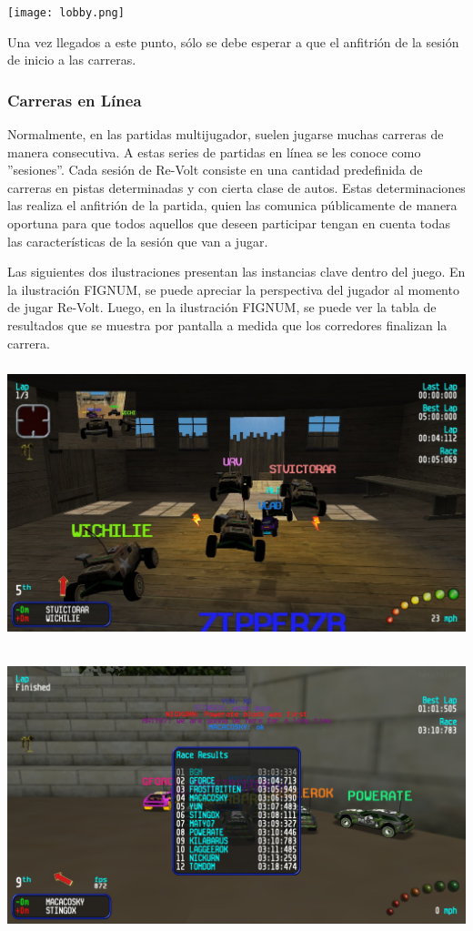 \texttt{[image: lobby.png]}

Una vez llegados a este punto, sólo se debe esperar a que el anfitrión de la sesión de inicio a las carreras.

\subsubsection{Carreras en Línea}
Normalmente, en las partidas multijugador, suelen jugarse muchas carreras de manera consecutiva. A estas series de partidas en línea se les conoce como ''sesiones''. Cada sesión de Re-Volt consiste en una cantidad predefinida de carreras en pistas determinadas y con cierta clase de autos. Estas determinaciones las realiza el anfitrión de la partida, quien las comunica públicamente de manera oportuna para que todos aquellos que deseen participar tengan en cuenta todas las características de la sesión que van a jugar.

Las siguientes dos ilustraciones presentan las instancias clave dentro del juego. En la ilustración FIGNUM, se puede apreciar la perspectiva del jugador al momento de jugar Re-Volt. Luego, en la ilustración FIGNUM, se puede ver la tabla de resultados que se muestra por pantalla a medida que los corredores finalizan la carrera.

\includegraphics[width=15cm, height=8cm]{img/gameplay.jpg}

\includegraphics[width=15cm, height=8cm]{img/results.png}

